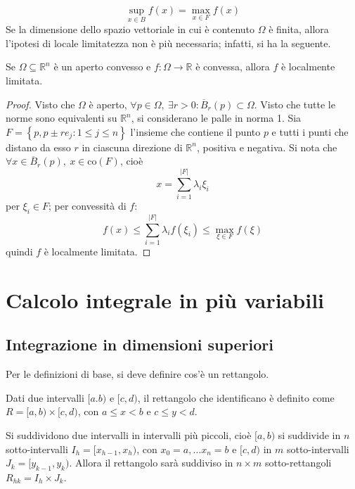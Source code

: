 \documentclass[11pt, a4paper]{scrartcl}
\theoremstyle{definition}
\numberwithin{esempio}{section}
\theoremstyle{definition}
\numberwithin{obs}{section}
\numberwithin{nota}{section}
\numberwithin{equation}{subsection}
\begin{document}
\[
\sup_{x \in B } f(x) = \max _{x \in F} f(x)
\] 
Se la dimensione dello spazio vettoriale in cui \`e contenuto $\Omega $ \`e finita, allora l'ipotesi di locale limitatezza non \`e pi\`u necessaria; infatti, si ha la seguente.
\begin{prop}
	{}{}
	Se $\Omega \subseteq \mathbb{R}^n$ \`e un aperto convesso e $f:\Omega \to \mathbb{R}$ \`e convessa, allora $f$ \`e localmente limitata.
	\begin{proof}
		Visto che $\Omega $ \`e aperto, $\forall p \in \Omega , \ \exists r >0 : \overline{B}_r(p) \subset \Omega $.
		Visto che tutte le norme sono equivalenti su $\mathbb{R}^n$, si considerano le palle in norma 1. 
		Sia $F = \left\{ p, p\pm r e_j : 1\le j\le n \right\} $ l'insieme che contiene il punto $p$ e tutti i punti che distano da esso $r$ in ciascuna direzione di $\mathbb{R}^n$, positiva e negativa.
		Si nota che $\forall x \in \overline{B}_r (p), \ x \in \mathrm{co} (F)$, cio\`e
		\[
		x = \sum_{i=1}^{\lvert F \rvert } \lambda _i \xi _i
		\] 
		per $\xi _i \in F$; per convessit\`a di $f$:
		\[
		f(x) \le \sum_{i=1}^{\lvert F \rvert } \lambda _i f(\xi _i) \le \max _{\xi \in F} f(\xi )
		\] 
		quindi $f$ \`e localmente limitata.
	\end{proof}
\end{prop}
\newpage 

\section{Calcolo integrale in pi\`u variabili}

\subsection{Integrazione in dimensioni superiori}
Per le definizioni di base, si deve definire cos'\`e un rettangolo.
\begin{definizione}
	{}{}
	Dati due intervalli $[a.b)$ e $[c,d)$, il rettangolo che identificano \`e definito come $R = [a,b) \times  [c,d)$, con $a\le x< b$ e $c\le y<d$.
\end{definizione}
\noindent Si suddividono due intervalli in intervalli pi\`u piccoli, cio\`e $[a,b)$ si suddivide in $n$ sotto-intervalli $I_h = [x_{h-1} ,x_h)$, con $x_0 =a , \ldots x_n = b$ e $[c,d)$ in $m$ sotto-intervalli $J_k = [y_{k-1} ,y_k)$. Allora il rettangolo sar\`a suddiviso in $n\times m$ sotto-rettangoli $R_{hk}  = I_h \times J_k$.
\end{document}
